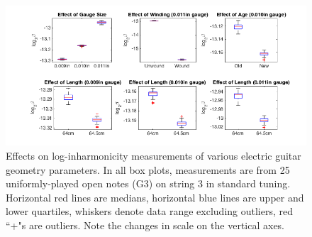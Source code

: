 \documentclass[12pt]{cmuthesis}
\begin{document}
\begin{figure}[!htbp] 
\centering
\includegraphics[scale=0.60]{eg-params}
\caption{Effects on log-inharmonicity measurements of various electric guitar geometry parameters. In all box plots, measurements are from 25 uniformly-played open notes (G3) on string 3 in standard tuning. Horizontal red lines are medians, horizontal blue lines are upper and lower quartiles, whiskers denote data range excluding outliers, red ``+"s are outliers. Note the changes in scale on the vertical axes.}
\label{fig:eg-params}
\end{figure} 

\end{document}
